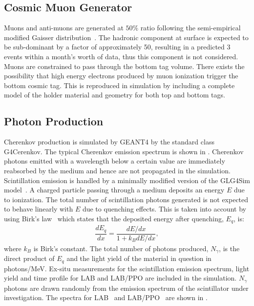 \subsection{Cosmic Muon Generator}
\label{sec:primarygen}

Muons and anti-muons are generated at $50\%$ ratio following the semi-empirical modified Gaisser distribution~\cite{gaisser-mod}. The hadronic component at surface is expected to be sub-dominant by a factor of approximately 50, resulting in a predicted 3 events within a month's worth of data, thus this component is not considered.  Muons are constrained to pass through the bottom tag volume.
There exists the possibility that high energy electrons produced by muon ionization trigger the bottom cosmic tag. This is reproduced in simulation by including a complete model of the holder material and geometry for both top and bottom tags.



\subsection{Photon Production \label{sec:photon_prod}}

Cherenkov production is simulated by GEANT4 by the standard class G4Cerenkov. The typical Cherenkov emission spectrum is shown in . Cherenkov photons emitted with a wavelength below a certain value are immediately reabsorbed by the medium and hence are not propagated in the simulation. Scintillation emission is handled by a minimally modified version of the GLG4Sim model~\cite{glg4sim}. A charged particle passing through a medium deposits an energy $E$ due to ionization. The total number of scintillation photons generated is not expected to behave linearly with $E$ due to quenching effects. This is taken into account by using Birk's law~\cite{birks} which states that the deposited energy after quenching, $E_{q}$, is:
\begin{eqnarray}
	\dfrac{dE_{q}}{dx} = \dfrac{dE/dx}{1+ k_BdE/dx},
    \label{eq:birk}
\end{eqnarray}
where $k_B$ is Birk's constant. The total number of  photons produced, $N_{\gamma}$, is the direct product of $E_{q}$ and the light yield of the material in question in photons/MeV. Ex-situ measurements for the scintillation emission spectrum, light yield and time profile for LAB and LAB/PPO are included in the simulation. $N_{\gamma}$ photons are drawn randomly from the emission spectrum of the scintillator under investigation. The spectra for LAB~\cite{lab_emission} and LAB/PPO~\cite{snop_private} are shown in . 

